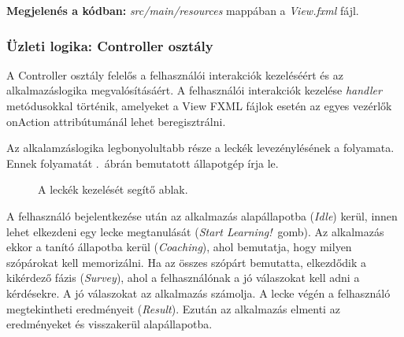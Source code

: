 \documentclass[11pt, a4paper]{article}
\begin{document}
 	\textbf{Megjelenés a kódban:} \textit{src/main/resources} mappában a \textit{View.fxml} fájl.
   
     \subsubsection{Üzleti logika: Controller osztály}
     A Controller osztály felelős a felhasználói interakciók kezeléséért és az alkalmazáslogika megvalósításáért. A felhasználói interakciók kezelése \emph{handler} metódusokkal történik, amelyeket a View FXML fájlok esetén az egyes vezérlők onAction attribútumánál lehet beregisztrálni.
     
     Az alkalamzáslogika legbonyolultabb része a leckék levezénylésének a folyamata. Ennek folyamatát .~ábrán bemutatott állapotgép írja le.
     \begin{figure}[h!]
     	\center
     	\caption{A leckék kezelését segítő ablak.}
     	\label{fig:business-logic}
     \end{figure}
 
 	A felhasználó bejelentkezése után az alkalmazás alapállapotba (\emph{Idle}) kerül, innen lehet elkezdeni egy lecke megtanulását (\emph{Start Learning!}~gomb). Az alkalmazás ekkor a tanító állapotba kerül (\emph{Coaching}), ahol bemutatja, hogy milyen szópárokat kell memorizálni. Ha az összes szópárt bemutatta, elkezdődik a kikérdező fázis (\emph{Survey}), ahol a felhasználónak a jó válaszokat kell adni a kérdésekre. A jó válaszokat az alkalmazás számolja. A lecke végén a felhasználó megtekintheti eredményeit (\emph{Result}). Ezután az alkalmazás elmenti az eredményeket és visszakerül alapállapotba.
     
\end{document}
